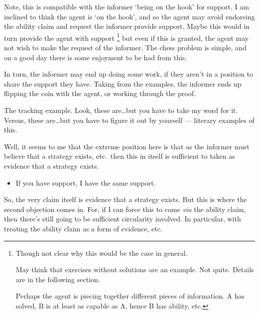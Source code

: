 \documentclass[10pt]{article}
\begin{document}
\begin{note}[Guarantee]
  Note, this is compatible with the informer `being on the hook' for support.
I am inclined to think the agent is `on the hook', and so the agent may avoid endorsing the ability claim and request the informer provide support.
Maybe this would in turn provide the agent with support\nolinebreak
\footnote{
  Though not clear why this would be the case in general.

  May think that exercises without solutions are an example.
  Not quite.
  Details are in the following section.

  Perhaps the agent is piecing together different pieces of information.
  A has solved, B is at least as capable as A, hence B has ability, etc.
}
but even if this is granted, the agent may not wish to make the request of the informer.
The chess problem is simple, and on a good day there is some enjoyment to be had from this.

In turn, the informer may end up doing some work, if they aren't in a position to share the support they have.
Taking from the examples, the informer ends up flipping the coin with the agent, or working through the proof.
\end{note}

\begin{note}
  The tracking example.
  Look, these are\dots but you have to take my word for it.
  Versus, these are\dots but you have to figure it out by yourself --- literary examples of this.
\end{note}


\begin{note}
  Well, it seems to me that the extreme position here is that as the informer must believe that a strategy exists, etc.\ then this in itself is sufficient to taken as evidence that a strategy exists.

  \begin{itemize}
  \item If you have support, I have the same support.
  \end{itemize}

  So, the very claim itself is evidence that a strategy exists.
  But this is where the second objection comes in.
  For, if I can force this to come \emph{via} the ability claim, then there's still going to be sufficient circularity involved.
  In particular, with treating the ability claim as a form of evidence, etc.\
\end{note}
\end{document}
